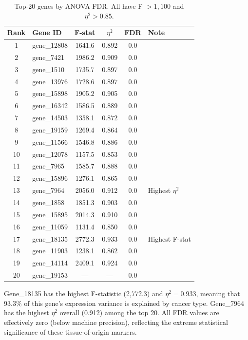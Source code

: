 \documentclass{article}
\begin{document}
\begin{table}[H]
\caption{Top-20 genes by ANOVA FDR. All have F $> 1{,}100$ and $\eta^2 > 0.85$.}
\label{tab:top20}
\begin{center}
\begin{tabular}{clcccl}
\toprule
\textbf{Rank} & \textbf{Gene ID} & \textbf{F-stat} & \textbf{$\eta^2$} & \textbf{FDR} & \textbf{Note}\\
\midrule
1  & gene\_12808 & 1641.6 & 0.892 & 0.0 & \\
2  & gene\_7421  & 1986.2 & 0.909 & 0.0 & \\
3  & gene\_1510  & 1735.7 & 0.897 & 0.0 & \\
4  & gene\_13976 & 1728.6 & 0.897 & 0.0 & \\
5  & gene\_15898 & 1905.2 & 0.905 & 0.0 & \\
6  & gene\_16342 & 1586.5 & 0.889 & 0.0 & \\
7  & gene\_14503 & 1358.1 & 0.872 & 0.0 & \\
8  & gene\_19159 & 1269.4 & 0.864 & 0.0 & \\
9  & gene\_11566 & 1546.8 & 0.886 & 0.0 & \\
10 & gene\_12078 & 1157.5 & 0.853 & 0.0 & \\
\midrule
11 & gene\_7965  & 1585.7 & 0.888 & 0.0 & \\
12 & gene\_15896 & 1276.1 & 0.865 & 0.0 & \\
13 & gene\_7964  & 2056.0 & 0.912 & 0.0 & Highest $\eta^2$\\
14 & gene\_1858  & 1851.3 & 0.903 & 0.0 & \\
15 & gene\_15895 & 2014.3 & 0.910 & 0.0 & \\
16 & gene\_11059 & 1131.4 & 0.850 & 0.0 & \\
17 & gene\_18135 & 2772.3 & 0.933 & 0.0 & Highest F-stat\\
18 & gene\_11903 & 1238.1 & 0.862 & 0.0 & \\
19 & gene\_14114 & 2409.1 & 0.924 & 0.0 & \\
20 & gene\_19153 & --- & --- & 0.0 & \\
\bottomrule
\end{tabular}
\end{center}
\end{table}

Gene\_18135 has the highest F-statistic (2{,}772.3) and $\eta^2 = 0.933$, meaning that 93.3\% of this gene's expression variance is explained by cancer type. Gene\_7964 has the highest $\eta^2$ overall (0.912) among the top 20. All FDR values are effectively zero (below machine precision), reflecting the extreme statistical significance of these tissue-of-origin markers.
\end{document}
